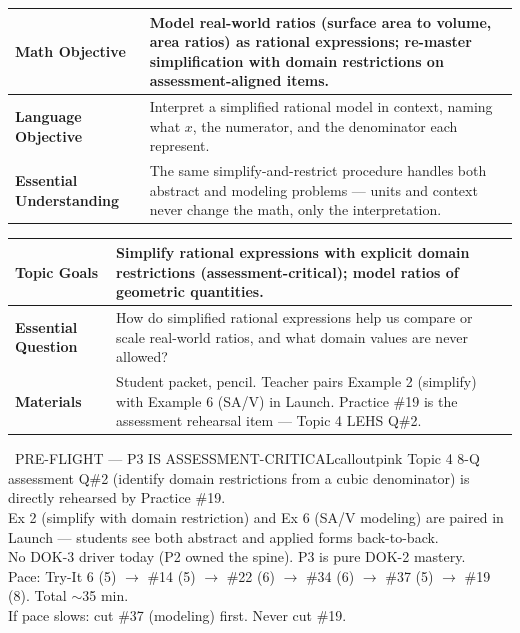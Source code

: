 \documentclass[11pt]{article}
\begin{document}

{\small
\renewcommand{\arraystretch}{1.25}
\noindent\begin{tabular}{|p{1.8in}|p{4.8in}|}
\hline
\textbf{Math Objective} & Model real-world ratios (surface area to volume, area ratios) as rational expressions; re-master simplification with domain restrictions on assessment-aligned items. \\ \hline
\textbf{Language Objective} & Interpret a simplified rational model in context, naming what \(x\), the numerator, and the denominator each represent. \\ \hline
\textbf{Essential Understanding} & The same simplify-and-restrict procedure handles both abstract and modeling problems --- units and context never change the math, only the interpretation. \\ \hline
\end{tabular}
}

{\small
\renewcommand{\arraystretch}{1.25}
\noindent\begin{tabular}{|p{1.8in}|p{4.8in}|}
\hline
\textbf{Topic Goals} & Simplify rational expressions with explicit domain restrictions (assessment-critical); model ratios of geometric quantities. \\ \hline
\textbf{Essential Question} & How do simplified rational expressions help us compare or scale real-world ratios, and what domain values are never allowed? \\ \hline
\textbf{Materials} & Student packet, pencil. Teacher pairs Example 2 (simplify) with Example 6 (SA/V) in Launch. Practice \#19 is the assessment rehearsal item --- Topic 4 LEHS Q\#2. \\ \hline
\end{tabular}
}

\begin{callout}{\IconPin\ PRE-FLIGHT --- P3 IS ASSESSMENT-CRITICAL}{calloutpink}
Topic 4 8-Q assessment Q\#2 (identify domain restrictions from a cubic denominator) is directly rehearsed by Practice \#19.\\
Ex 2 (simplify with domain restriction) and Ex 6 (SA/V modeling) are paired in Launch --- students see both abstract and applied forms back-to-back.\\
No DOK-3 driver today (P2 owned the spine). P3 is pure DOK-2 mastery.\\
Pace: Try-It 6 (5) \(\rightarrow\) \#14 (5) \(\rightarrow\) \#22 (6) \(\rightarrow\) \#34 (6) \(\rightarrow\) \#37 (5) \(\rightarrow\) \#19 (8). Total \(\sim\)35 min.\\
If pace slows: cut \#37 (modeling) first. Never cut \#19.
\end{callout}
\end{document}
